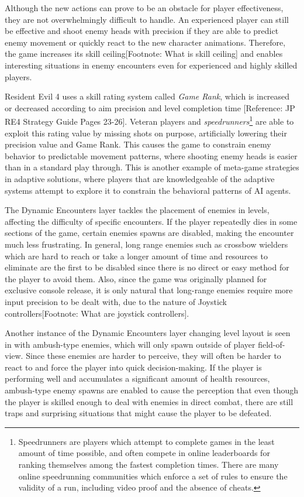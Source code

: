\documentclass[cic,tc,english]{iiufrgs}
\begin{document}
Although the new actions can prove to be an obstacle for player effectiveness, they are not overwhelmingly difficult to handle. An experienced player can still be effective and shoot enemy heads with precision if they are able to predict enemy movement or quickly react to the new character animations. Therefore, the game increases its skill ceiling[Footnote: What is skill ceiling] and enables interesting situations in enemy encounters even for experienced and highly skilled players. 

Resident Evil 4 uses a skill rating system called \emph{Game Rank}, which is increased or decreased according to aim precision and level completion time [Reference: JP RE4 Strategy Guide Pages 23-26]. Veteran players and \emph{speedrunners}\footnote{Speedrunners are players which attempt to complete games in the least amount of time possible, and often compete in online leaderboards for ranking themselves among the fastest completion times. There are many online speedrunning communities which enforce a set of rules to ensure the validity of a run, including video proof and the absence of cheats.} are able to exploit this rating value by missing shots on purpose, artificially lowering their precision value and Game Rank. This causes the game to constrain enemy behavior to predictable movement patterns, where shooting enemy heads is easier than in a standard play through. This is another example of meta-game strategies in adaptive solutions, where players that are knowledgeable of the adaptive systems attempt to explore it to constrain the behavioral patterns of AI agents.

The Dynamic Encounters layer tackles the placement of enemies in levels, affecting the difficulty of specific encounters. If the player repeatedly dies in some sections of the game, certain enemies spawns are disabled, making the encounter much less frustrating. In general, long range enemies such as crossbow wielders which are hard to reach or take a longer amount of time and resources to eliminate are the first to be disabled since there is no direct or easy method for the player to avoid them. Also, since the game was originally planned for exclusive console release, it is only natural that long-range enemies require more input precision to be dealt with, due to the nature of Joystick controllers[Footnote: What are joystick controllers].

Another instance of the Dynamic Encounters layer changing level layout is seen in with ambush-type enemies, which will only spawn outside of player field-of-view. Since these enemies are harder to perceive, they will often be harder to react to and force the player into quick decision-making. If the player is performing well and accumulates a significant amount of health resources, ambush-type enemy spawns are enabled to cause the perception that even though the player is skilled enough to deal with enemies in direct combat, there are still traps and surprising situations that might cause the player to be defeated.
\end{document}
